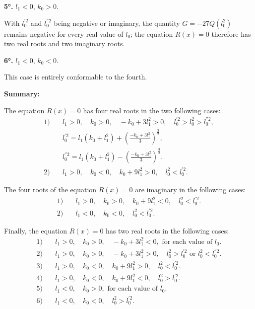 \documentclass{article}
\begin{document}
\textbf{5°.} $l_1 < 0$, $k_0 > 0$.

With $l_0^{'2}$ and $l_0^{''2}$ being negative or imaginary, the quantity $G = -27Q(l_0^2)$ remains negative for every real value of $l_0$; the equation $R(x) = 0$ therefore has two real roots and two imaginary roots.

\textbf{6°.} $l_1 < 0$, $k_0 < 0$.

This case is entirely conformable to the fourth.


\textbf{Summary:}

The equation $R(x) = 0$ has four real roots in the two following cases:
\begin{align*}
\text{1)} \quad &l_1 > 0, \quad k_0 > 0, \quad -k_0 + 3l_1^2 > 0, \quad l_0^{'2} > l_0^2 > l_0^{''2}, \\
&l_0^{'2} = l_1(k_0 + l_1^2) +  \left(\frac{-k_0 + 3l_1^2}{3}\right)^{\frac{3}{2}}, \\
&l_0^{''2} = l_1(k_0 + l_1^2) -  \left(\frac{-k_0 + 3l_1^2}{3}\right)^{\frac{3}{2}}. \\
\text{2)} \quad &l_1 > 0, \quad k_0 < 0, \quad k_0 + 9l_1^2 > 0, \quad l_0^2 < l_0^{'2}.
\end{align*}

The four roots of the equation $R(x) = 0$ are imaginary in the following cases:
\begin{align*}
\text{1)} \quad &l_1 > 0, \quad k_0 > 0, \quad k_0 + 9l_1^2 < 0, \quad l_0^2 < l_0^{'2}. \\
\text{2)} \quad &l_1 < 0, \quad k_0 < 0, \quad l_0^2 < l_0^{'2}.
\end{align*}

Finally, the equation $R(x) = 0$ has two real roots in the following cases:
\begin{align*}
\text{1)} \quad &l_1 > 0, \quad k_0 > 0, \quad -k_0 + 3l_1^2 < 0, \text{ for each value of } l_0. \\
\text{2)} \quad &l_1 > 0, \quad k_0 > 0, \quad -k_0 + 3l_1^2 > 0, \quad l_0^2 > l_0^{'2} \text{ or } l_0^2 < l_0^{''2}. \\
\text{3)} \quad &l_1 > 0, \quad k_0 < 0, \quad k_0 + 9l_1^2 > 0, \quad l_0^2 < l_0^{'2}. \\
\text{4)} \quad &l_1 > 0, \quad k_0 < 0, \quad k_0 + 9l_1^2 < 0, \quad l_0^2 > l_0^{'2}. \\
\text{5)} \quad &l_1 < 0, \quad k_0 > 0, \text{ for each value of } l_0. \\
\text{6)} \quad &l_1 < 0, \quad k_0 < 0, \quad l_0^2 > l_0^{'2}.
\end{align*}
\end{document}
